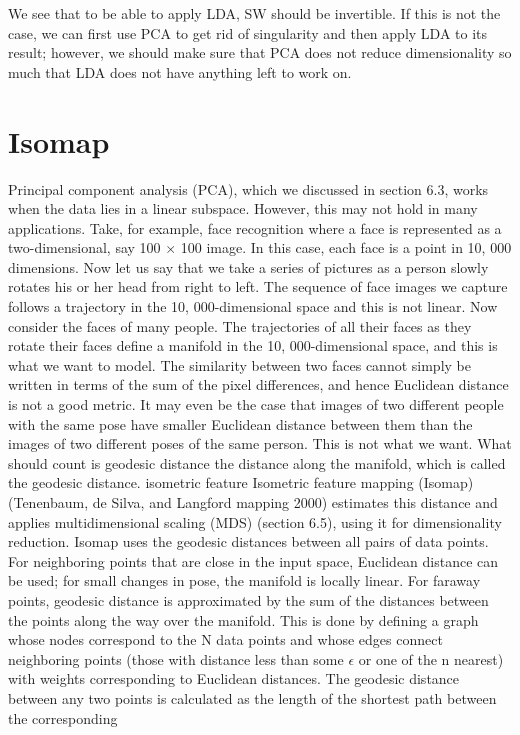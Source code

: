 We see that to be able to apply LDA, SW should be invertible. If this is not the case, we can first use PCA to get rid of singularity and then apply LDA to its result; however, we should make sure that PCA does not reduce dimensionality so much that LDA does not have anything left to work on.

\section{Isomap}

Principal component analysis (PCA), which we discussed in section 6.3, works when the data lies in a linear subspace. However, this may not hold in many applications. Take, for example, face recognition where a face is represented as a two-dimensional, say 100 $\times$ 100 image. In this case, each face is a point in 10, 000 dimensions. Now let us say that we take a series of pictures as a person slowly rotates his or her head from right to left. The sequence of face images we capture follows a trajectory in the 10, 000-dimensional space and this is not linear. Now consider the faces of many people. The trajectories of all their faces as they rotate their faces define a manifold in the 10, 000-dimensional space, and this is what we want to model. The similarity between two faces cannot simply be written in terms of the sum of the pixel differences, and hence Euclidean distance is not a good metric. It may even be the case that images of two different people with the same pose have smaller Euclidean distance between them than the images of two different poses of the same person. This is not what we want. What should count is geodesic distance the distance along the manifold, which is called the geodesic distance. isometric feature Isometric feature mapping (Isomap) (Tenenbaum, de Silva, and Langford mapping 2000) estimates this distance and applies multidimensional scaling (MDS) (section 6.5), using it for dimensionality reduction. Isomap uses the geodesic distances between all pairs of data points. For neighboring points that are close in the input space, Euclidean distance can be used; for small changes in pose, the manifold is locally linear. For faraway points, geodesic distance is approximated by the sum of the distances between the points along the way over the manifold. This is done by defining a graph whose nodes correspond to the N data points and whose edges connect neighboring points (those with distance less than some $\epsilon$ or one of the n nearest) with weights corresponding to Euclidean distances. The geodesic distance between any two points is calculated as the length of the shortest path between the corresponding

